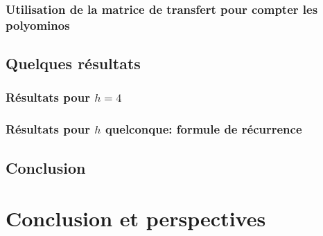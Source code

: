\documentclass[12pt]{memoireuqam1.3}
\begin{document}
\subsection{Utilisation de la matrice de transfert pour compter les polyominos}
\section{Quelques résultats}
\subsection{Résultats pour $h=4$}
\subsection{Résultats pour $h$ quelconque: formule de récurrence }
\section*{Conclusion}
\chapter{Conclusion et perspectives}
\renewcommand \bibname{R\'EF\'ERENCES}%

\renewcommand \listfigurename{LISTE DES FIGURES}
\renewcommand \appendixname{APPENDICE}
\renewcommand \figurename{Figure}
\renewcommand \tablename{Tableau}

\addtocounter{page}{1} %

\tableofcontents %
\listoftables %
\listoffigures %















\end{document}
